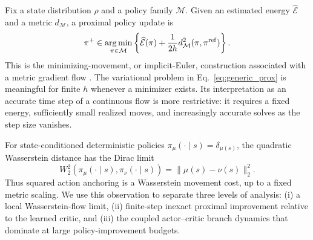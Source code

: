 Fix a state distribution $\rho$ and a policy family $\mathcal M$. Given an
estimated energy $\widehat{\mathcal E}$ and a metric $d_{\mathcal M}$, a
proximal policy update is
\begin{equation}
 \pi^+\in\operatorname*{arg\,min}_{\pi\in\mathcal M}
 \left\{\widehat{\mathcal E}(\pi)
 +\frac{1}{2h}d_{\mathcal M}^2(\pi,\pi^{\rm ref})\right\}.
 \label{eq:generic_prox}
\end{equation}
This is the minimizing-movement, or implicit-Euler, construction associated
with a metric gradient flow \citep{ambrosio2005gradient,otto2001geometry}. The
variational problem in Eq.~\eqref{eq:generic_prox} is meaningful for finite
$h$ whenever a minimizer exists. Its interpretation as an accurate time step
of a continuous flow is more restrictive: it requires a fixed energy,
sufficiently small realized moves, and increasingly accurate solves as the
step size vanishes.

For state-conditioned deterministic policies
$\pi_\mu(\cdot\mid s)=\delta_{\mu(s)}$, the quadratic Wasserstein distance has
the Dirac limit
\begin{equation}
 W_2^2\!\left(\pi_\mu(\cdot\mid s),\pi_\nu(\cdot\mid s)\right)
 =\|\mu(s)-\nu(s)\|_2^2.
 \label{eq:dirac_w2_background}
\end{equation}
Thus squared action anchoring is a Wasserstein movement cost, up to a fixed
metric scaling. We use this observation to separate three levels of analysis:
(i) a local Wasserstein-flow limit, (ii) finite-step inexact proximal
improvement relative to the learned critic, and (iii) the coupled actor--critic
branch dynamics that dominate at large policy-improvement budgets.

